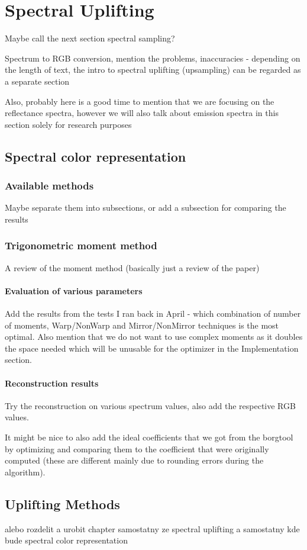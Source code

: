 \chapter{Spectral Uplifting}



Maybe call the next section spectral sampling? 


Spectrum to RGB conversion, mention the problems, inaccuracies - depending on the length of text, the intro to spectral uplifting (upsampling) can be regarded as a separate section

Also, probably here is a good time to mention that we are focusing on the reflectance spectra, however we will also talk about emission spectra in this section solely for research purposes

\section{Spectral color representation}


\subsection{Available methods}

Maybe separate them into subsections, or add a subsection for comparing the results

\subsection{Trigonometric moment method}

A review of the moment method (basically just a review of the paper)

\subsubsection{Evaluation of various parameters}

Add the results from the tests I ran back in April - which combination of number of moments, Warp/NonWarp and Mirror/NonMirror techniques is the most optimal. Also mention that we do not want to use complex moments as it doubles the space needed which will be unusable for the optimizer in the Implementation section. 

\subsubsection{Reconstruction results}
Try the reconstruction on various spectrum values, also add the respective RGB values.

It might be nice to also add the ideal coefficients that we got from the borgtool by optimizing and comparing them to the coefficient that were originally computed (these are different mainly due to rounding errors during the algorithm). 

\section{Uplifting Methods}

alebo rozdelit a urobit chapter samostatny ze spectral uplifting a samostatny kde bude spectral color representation